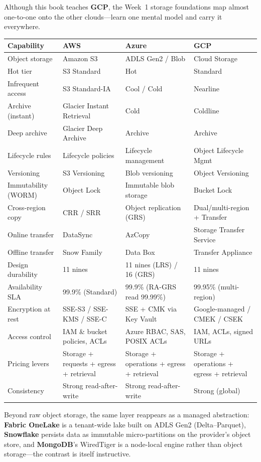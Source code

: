 \begin{crosscloud}
Although this book teaches \textbf{GCP}, the Week~1 storage foundations map almost one-to-one onto the other clouds---learn one mental model and carry it everywhere.

\vspace{2mm}
{\footnotesize
\begin{tabular}{@{}p{2.8cm}p{3.0cm}p{3.0cm}p{3.0cm}@{}}
\toprule
\textbf{Capability} & \textbf{AWS} & \textbf{Azure} & \textbf{GCP} \\
\midrule
Object storage & Amazon S3 & ADLS Gen2 / Blob & Cloud Storage \\
Hot tier & S3 Standard & Hot & Standard \\
Infrequent access & S3 Standard-IA & Cool / Cold & Nearline \\
Archive (instant) & Glacier Instant Retrieval & Cold & Coldline \\
Deep archive & Glacier Deep Archive & Archive & Archive \\
Lifecycle rules & Lifecycle policies & Lifecycle management & Object Lifecycle Mgmt \\
Versioning & S3 Versioning & Blob versioning & Object Versioning \\
Immutability (WORM) & Object Lock & Immutable blob storage & Bucket Lock \\
Cross-region copy & CRR / SRR & Object replication (GRS) & Dual/multi-region + Transfer \\
Online transfer & DataSync & AzCopy & Storage Transfer Service \\
Offline transfer & Snow Family & Data Box & Transfer Appliance \\
\addlinespace
Design durability & 11 nines & 11 nines (LRS) / 16 (GRS) & 11 nines \\
Availability SLA & 99.9\% (Standard) & 99.9\% (RA-GRS read 99.99\%) & 99.95\% (multi-region) \\
Encryption at rest & SSE-S3 / SSE-KMS / SSE-C & SSE + CMK via Key Vault & Google-managed / CMEK / CSEK \\
Access control & IAM \& bucket policies, ACLs & Azure RBAC, SAS, POSIX ACLs & IAM, ACLs, signed URLs \\
Pricing levers & Storage + requests + egress + retrieval & Storage + operations + egress + retrieval & Storage + operations + egress + retrieval \\
Consistency & Strong read-after-write & Strong read-after-write & Strong (global) \\
\bottomrule
\end{tabular}}

\vspace{1mm}
Beyond raw object storage, the same layer reappears as a managed abstraction: \textbf{Fabric OneLake} is a tenant-wide lake built on ADLS Gen2 (Delta--Parquet), \textbf{Snowflake} persists data as immutable micro-partitions on the provider's object store, and \textbf{MongoDB}'s WiredTiger is a node-local engine rather than object storage---the contrast is itself instructive.
\end{crosscloud}

